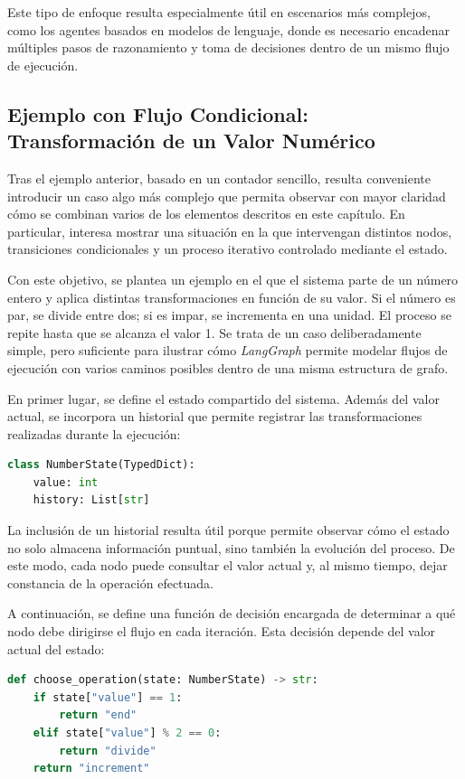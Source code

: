 \documentclass[12pt,a4paper,twoside,openright]{book}
\begin{document}
Este tipo de enfoque resulta especialmente útil en escenarios más complejos, como los agentes basados en modelos de lenguaje, donde es necesario encadenar múltiples pasos de razonamiento y toma de decisiones dentro de un
mismo flujo de ejecución.


\subsection{Ejemplo con Flujo Condicional: Transformación de un Valor Numérico}

Tras el ejemplo anterior, basado en un contador sencillo, resulta conveniente introducir un caso algo más complejo que permita observar con mayor claridad cómo se combinan varios de los elementos descritos en este capítulo.
En particular, interesa mostrar una situación en la que intervengan distintos nodos, transiciones condicionales y un proceso iterativo controlado mediante el estado.

Con este objetivo, se plantea un ejemplo en el que el sistema parte de un número entero y aplica distintas transformaciones en función de su valor. Si el número es par, se divide entre dos; si es impar, se incrementa en una
unidad. El proceso se repite hasta que se alcanza el valor 1. Se trata de un caso deliberadamente simple, pero suficiente para ilustrar cómo \emph{LangGraph} permite modelar flujos de ejecución con varios caminos posibles dentro
de una misma estructura de grafo.

En primer lugar, se define el estado compartido del sistema. Además del valor actual, se incorpora un historial que permite registrar las transformaciones realizadas durante la ejecución:

\begin{lstlisting}[language=Python, caption={Estructura del estado del grafo}]
class NumberState(TypedDict):
    value: int
    history: List[str]
\end{lstlisting}

La inclusión de un historial resulta útil porque permite observar cómo el estado no solo almacena información puntual, sino también la evolución del proceso. De este modo, cada nodo puede consultar el valor actual y, al mismo
tiempo, dejar constancia de la operación efectuada.

A continuación, se define una función de decisión encargada de determinar a qué nodo debe dirigirse el flujo en cada iteración. Esta decisión depende del valor actual del estado:

\begin{lstlisting}[language=Python, caption={Función de decisión}]
def choose_operation(state: NumberState) -> str:
    if state["value"] == 1:
        return "end"
    elif state["value"] % 2 == 0:
        return "divide"
    return "increment"
\end{lstlisting}
\end{document}

